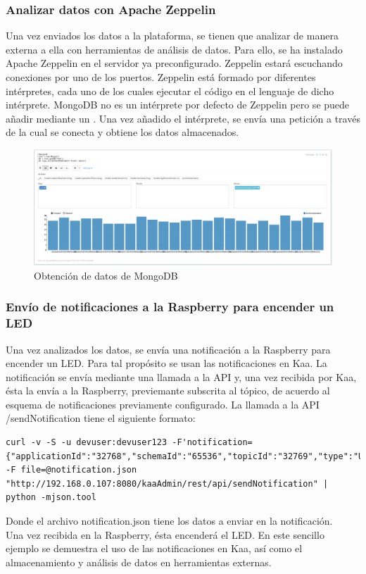 \documentclass[12pt, twoside]{book}
\newcommand{\MYhref}[3][blue]{\href{#2}{\color{#1}{#3}}}
\begin{document}
\subsubsection*{Analizar datos con Apache Zeppelin}
Una vez enviados los datos a la plataforma, se tienen que analizar de manera externa a ella con herramientas de análisis de datos. Para ello, se ha instalado Apache Zeppelin\cite{zeppelin} en el servidor ya preconfigurado. Zeppelin estará escuchando conexiones por uno de los puertos. Zeppelin está formado por diferentes intérpretes, cada uno de los cuales ejecutar el código en el lenguaje de dicho intérprete. MongoDB no es un intérprete por defecto de Zeppelin pero se puede añadir mediante un \MYhref{https://github.com/bbonnin/zeppelin-mongodb-interpreter}{plugin}. Una vez añadido el intérprete, se envía una petición a través de la cual se conecta y obtiene los datos almacenados.

\begin{figure}[H]
\centering
\includegraphics[scale=0.2]{images/mongo_zeppelin}
\caption{Obtención de datos de MongoDB}\label{L508}
\end{figure}

\subsubsection*{Envío de notificaciones a la Raspberry para encender un LED}
Una vez analizados los datos, se envía una notificación a la Raspberry para encender un LED. Para tal propósito se usan las notificaciones en Kaa. La notificación se envía mediante una llamada a la API y, una vez recibida por Kaa, ésta la envía a la Raspberry, previemante subscrita al tópico, de acuerdo al esquema de notificaciones previamente configurado. La llamada a la API /sendNotification tiene el siguiente formato:
\begin{lstlisting}[frame=shadowbox,basicstyle=\footnotesize , breaklines=true]
curl -v -S -u devuser:devuser123 -F'notification={"applicationId":"32768","schemaId":"65536","topicId":"32769","type":"USER"};type=application/json' -F file=@notification.json 
"http://192.168.0.107:8080/kaaAdmin/rest/api/sendNotification" | python -mjson.tool
\end{lstlisting}
Donde el archivo notification.json tiene los datos a enviar en la notificación.\\
Una vez recibida en la Raspberry, ésta encenderá el LED. En este sencillo ejemplo se demuestra el uso de las notificaciones en Kaa, así como el almacenamiento y análisis de datos en herramientas externas.
\end{document}
